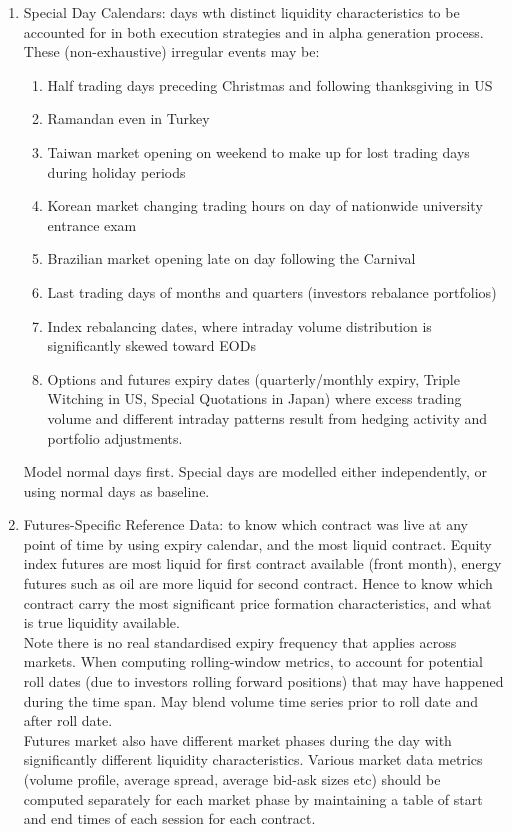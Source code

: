\begin{enumerate}[label=\roman*.]
\item Special Day Calendars: days wth distinct liquidity characteristics to be accounted for in both execution strategies and in alpha generation process. These (non-exhaustive) irregular events may be:
\begin{enumerate}[label=\arabic*.]
\setlength{\itemsep}{0pt}
\item Half trading days preceding Christmas and following thanksgiving in US
\item Ramandan even in Turkey
\item Taiwan market opening on weekend to make up for lost trading days during holiday periods
\item Korean market changing trading hours on day of nationwide university entrance exam
\item Brazilian market opening late on day following the Carnival
\item Last trading days of months and quarters (investors rebalance portfolios)
\item Index rebalancing dates, where intraday volume distribution is significantly skewed toward EODs
\item Options and futures expiry dates (quarterly/monthly expiry, Triple Witching in US, Special Quotations in Japan) where excess trading volume and different intraday patterns result from hedging activity and portfolio adjustments.
\end{enumerate}
Model normal days first. Special days are modelled either independently, or using normal days as baseline.
\item Futures-Specific Reference Data: to know which contract was live at any point of time by using expiry calendar, and the most liquid contract. Equity index futures are most liquid for first contract available (front month), energy futures such as oil are more liquid for second contract. Hence to know which contract carry the most significant price formation characteristics, and what is true liquidity available.\\
Note there is no real standardised expiry frequency that applies across markets. When computing rolling-window metrics, to account for potential roll dates (due to investors rolling forward positions) that may have happened during the time span. May blend volume time series prior to roll date and after roll date.\\
Futures market also have different market phases during the day with significantly different liquidity characteristics. Various market data metrics (volume profile, average spread, average bid-ask sizes etc) should be computed separately for each market phase by maintaining a table of start and end times of each session for each contract.

\end{enumerate}
